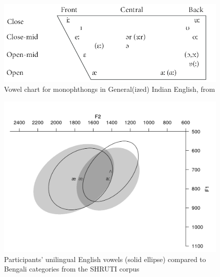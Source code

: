 \documentclass[12 pt]{article}
\begin{document}
\newpage

\begin{figure}[h] %
	\includegraphics[scale=1.2]{vowels_ie}
	\caption{Vowel chart for monophthongs in General(ized) Indian English, from \cite{masica1972sound}}
	\label{vowels_ie}
\end{figure}

\newpage

\begin{figure}[h] %
	\includegraphics[scale=1]{vowels_unilingual_ie_bengali}
	\caption{Participants' unilingual English vowels (solid ellipse) compared to Bengali categories from the SHRUTI corpus \citep{shruticorpus}}
	\label{vowels_unilingual_ie_bengali}
\end{figure}

\newpage
\end{document}
